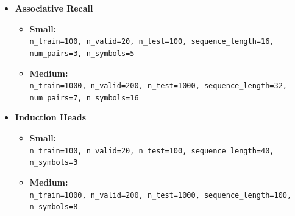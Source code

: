 \documentclass{article}
\begin{document}
\begin{itemize}
    \item \textbf{Associative Recall}
    \begin{itemize}
        \item \textbf{Small:}\\ \texttt{n\_train=100, n\_valid=20, n\_test=100, sequence\_length=16, num\_pairs=3, n\_symbols=5}
        \item \textbf{Medium:}\\ \texttt{n\_train=1000, n\_valid=200, n\_test=1000, sequence\_length=32, num\_pairs=7, n\_symbols=16}
    \end{itemize}

    \item \textbf{Induction Heads}
    \begin{itemize}
        \item \textbf{Small:}\\ \texttt{n\_train=100, n\_valid=20, n\_test=100, sequence\_length=40, n\_symbols=3}
        \item \textbf{Medium:}\\ \texttt{n\_train=1000, n\_valid=200, n\_test=1000, sequence\_length=100, n\_symbols=8}
    \end{itemize}

\end{itemize}



\end{document}
